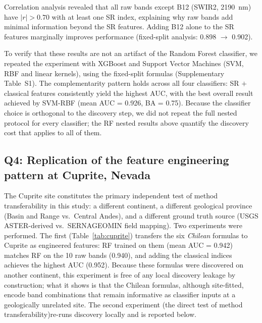 \documentclass[preprint,authoryear,number]{elsarticle}
\begin{document}
Correlation analysis revealed that all raw bands except B12 (SWIR2, \SI{2190}{\nano\meter}) have $|r| > 0.70$ with at least one SR index, explaining why raw bands add minimal information beyond the SR features. Adding B12 alone to the SR features marginally improves performance (fixed-split analysis: 0.898 $\rightarrow$ 0.902).

To verify that these results are not an artifact of the Random Forest classifier, we repeated the experiment with XGBoost \citep{Chen2016} and Support Vector Machines (SVM, RBF and linear kernels), using the fixed-split formulas (Supplementary Table~S1). The complementarity pattern holds across all four classifiers: SR $+$ classical features consistently yield the highest AUC, with the best overall result achieved by SVM-RBF (mean AUC = 0.926, BA = 0.75). Because the classifier choice is orthogonal to the discovery step, we did not repeat the full nested protocol for every classifier; the RF nested results above quantify the discovery cost that applies to all of them.

\subsection{Q4: Replication of the feature engineering pattern at Cuprite, Nevada}
\label{sec:cuprite_results}

The Cuprite site constitutes the primary independent test of method transferability in this study: a different continent, a different geological province (Basin and Range vs.\ Central Andes), and a different ground truth source (USGS ASTER-derived vs.\ SERNAGEOMIN field mapping). Two experiments were performed. The first (Table~\ref{tab:cuprite}) transfers the six \emph{Chilean} formulas to Cuprite as engineered features: RF trained on them (mean AUC = 0.942) matches RF on the 10 raw bands (0.940), and adding the classical indices achieves the highest AUC (0.952). Because these formulas were discovered on another continent, this experiment is free of any local discovery leakage by construction; what it shows is that the Chilean formulas, although site-fitted, encode band combinations that remain informative as classifier inputs at a geologically unrelated site. The second experiment (the direct test of method transferability)re-runs discovery locally and is reported below.
\end{document}
